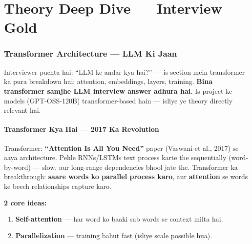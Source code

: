 \newpage

\part{Theory Deep Dive --- Interview Gold}

\section{Transformer Architecture --- LLM Ki Jaan}

\begin{storybox}
Interviewer puchta hai: ``LLM ke andar kya hai?'' --- is section mein transformer ka pura breakdown hai: attention, embeddings, layers, training. \textbf{Bina transformer samjhe LLM interview answer adhura hai.} Is project ke models (GPT-OSS-120B) transformer-based hain --- isliye ye theory directly relevant hai.
\end{storybox}

\subsection{Transformer Kya Hai --- 2017 Ka Revolution}

\begin{conceptbox}
Transformer: \textbf{``Attention Is All You Need''} paper (Vaswani et al., 2017) se aaya architecture. Pehle RNNs/LSTMs text process karte the sequentially (word-by-word) --- slow, aur long-range dependencies bhool jate the. Transformer ka breakthrough: \textbf{saare words ko parallel process karo}, aur \textbf{attention} se words ke beech relationships capture karo.

\textbf{2 core ideas:}
\begin{enumerate}[label=\arabic*.]
\item \textbf{Self-attention} --- har word ko baaki sab words se context milta hai.
\item \textbf{Parallelization} --- training bahut fast (isliye scale possible hua).
\end{enumerate}
\end{conceptbox}

